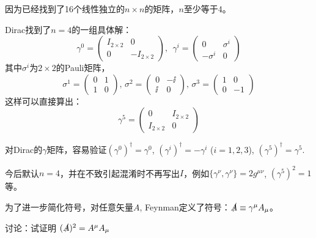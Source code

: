 \documentclass[CJK]{beamer}
\begin{document}
\begin{frame}
\bch
因为已经找到了16个线性独立的$n\times n$的矩阵，$n$至少等于4。

Dirac找到了$n=4$的一组具体解：
\begin{equation}
\gamma^0 = \left(\begin{array}{rr} I_{2\times 2} & 0 \\  0 & -I_{2\times 2} \end{array}\right) ,\ \ 
\gamma^i = \left(\begin{array}{rr} 0 & \sigma^i \\ -\sigma^i &  0 \end{array}\right) \nonumber
\end{equation}
其中$\sigma^i$为$2\times 2$的Pauli矩阵，
\begin{equation}
\sigma^1 = \left(\begin{array}{rr} 0 & 1 \\ 1 & 0 \end{array} \right),\, 
\sigma^2 = \left(\begin{array}{rr} 0 & -\ii \\ \ii & 0 \end{array} \right),\, 
\sigma^3 = \left(\begin{array}{rr} 1 & 0 \\ 0 & -1 \end{array} \right) 
\end{equation}
这样可以直接算出：
\begin{equation}
\gamma^5 = \left(\begin{array}{rr} 0 & I_{2\times 2} \\  I_{2\times 2} & 0 \end{array}\right) \nonumber
\end{equation}

对Dirac的$\gamma$矩阵，容易验证$(\gamma^0)^\dagger = \gamma^0$, $(\gamma^i)^\dagger = - \gamma^i$ ($i=1,2,3$), $(\gamma^5)^\dagger = \gamma^5$.
\ech
\end{frame}


\begin{frame}
\bch
今后默认$n=4$，并在不致引起混淆时不再写出$I$，例如$\{\gamma^\nu, \gamma^\nu\} = 2 g^{\mu\nu}$, $(\gamma^5)^2 = 1$等。

\skipline

为了进一步简化符号，对任意矢量$A$, Feynman定义了符号：$\slashed{A} \equiv \gamma^\mu A_\mu$。

\skipline

讨论：试证明 $(\slashed{A})^2 = A^\mu A_\mu $

\ech
\end{frame}
\end{document}
